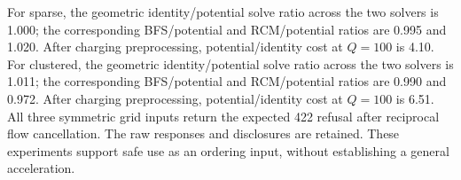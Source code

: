 For sparse, the geometric identity/potential solve ratio across the two solvers is 1.000; the corresponding BFS/potential and RCM/potential ratios are 0.995 and 1.020. After charging preprocessing, potential/identity cost at $Q=100$ is 4.10. For clustered, the geometric identity/potential solve ratio across the two solvers is 1.011; the corresponding BFS/potential and RCM/potential ratios are 0.990 and 0.972. After charging preprocessing, potential/identity cost at $Q=100$ is 6.51. All three symmetric grid inputs return the expected 422 refusal after reciprocal flow cancellation. The raw responses and disclosures are retained. These experiments support safe use as an ordering input, without establishing a general acceleration.
